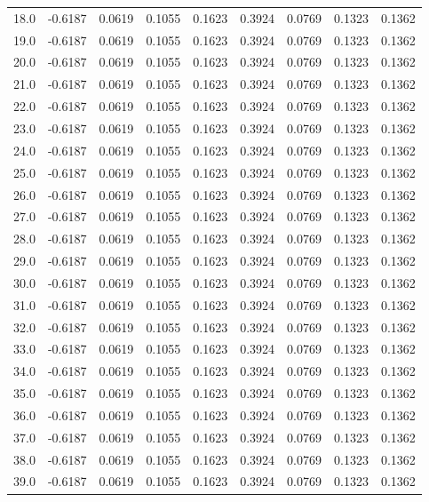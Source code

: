 \begin{longtable}{lrrrrrrrr}
18.0 & -0.6187 & 0.0619 & 0.1055 & 0.1623 & 0.3924 & 0.0769 & 0.1323 & 0.1362 \\
19.0 & -0.6187 & 0.0619 & 0.1055 & 0.1623 & 0.3924 & 0.0769 & 0.1323 & 0.1362 \\
20.0 & -0.6187 & 0.0619 & 0.1055 & 0.1623 & 0.3924 & 0.0769 & 0.1323 & 0.1362 \\
21.0 & -0.6187 & 0.0619 & 0.1055 & 0.1623 & 0.3924 & 0.0769 & 0.1323 & 0.1362 \\
22.0 & -0.6187 & 0.0619 & 0.1055 & 0.1623 & 0.3924 & 0.0769 & 0.1323 & 0.1362 \\
23.0 & -0.6187 & 0.0619 & 0.1055 & 0.1623 & 0.3924 & 0.0769 & 0.1323 & 0.1362 \\
24.0 & -0.6187 & 0.0619 & 0.1055 & 0.1623 & 0.3924 & 0.0769 & 0.1323 & 0.1362 \\
25.0 & -0.6187 & 0.0619 & 0.1055 & 0.1623 & 0.3924 & 0.0769 & 0.1323 & 0.1362 \\
26.0 & -0.6187 & 0.0619 & 0.1055 & 0.1623 & 0.3924 & 0.0769 & 0.1323 & 0.1362 \\
27.0 & -0.6187 & 0.0619 & 0.1055 & 0.1623 & 0.3924 & 0.0769 & 0.1323 & 0.1362 \\
28.0 & -0.6187 & 0.0619 & 0.1055 & 0.1623 & 0.3924 & 0.0769 & 0.1323 & 0.1362 \\
29.0 & -0.6187 & 0.0619 & 0.1055 & 0.1623 & 0.3924 & 0.0769 & 0.1323 & 0.1362 \\
30.0 & -0.6187 & 0.0619 & 0.1055 & 0.1623 & 0.3924 & 0.0769 & 0.1323 & 0.1362 \\
31.0 & -0.6187 & 0.0619 & 0.1055 & 0.1623 & 0.3924 & 0.0769 & 0.1323 & 0.1362 \\
32.0 & -0.6187 & 0.0619 & 0.1055 & 0.1623 & 0.3924 & 0.0769 & 0.1323 & 0.1362 \\
33.0 & -0.6187 & 0.0619 & 0.1055 & 0.1623 & 0.3924 & 0.0769 & 0.1323 & 0.1362 \\
34.0 & -0.6187 & 0.0619 & 0.1055 & 0.1623 & 0.3924 & 0.0769 & 0.1323 & 0.1362 \\
35.0 & -0.6187 & 0.0619 & 0.1055 & 0.1623 & 0.3924 & 0.0769 & 0.1323 & 0.1362 \\
36.0 & -0.6187 & 0.0619 & 0.1055 & 0.1623 & 0.3924 & 0.0769 & 0.1323 & 0.1362 \\
37.0 & -0.6187 & 0.0619 & 0.1055 & 0.1623 & 0.3924 & 0.0769 & 0.1323 & 0.1362 \\
38.0 & -0.6187 & 0.0619 & 0.1055 & 0.1623 & 0.3924 & 0.0769 & 0.1323 & 0.1362 \\
39.0 & -0.6187 & 0.0619 & 0.1055 & 0.1623 & 0.3924 & 0.0769 & 0.1323 & 0.1362 \\

\end{longtable}
